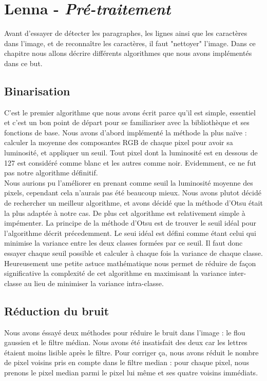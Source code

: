 \chapter{Lenna - \emph{Pré-traitement}}
Avant d'essayer de détecter les paragraphes, les lignes ainsi que les caractères dans l'image, et de reconnaître les caractères, il faut "nettoyer" l'image. Dans ce chapitre nous allons décrire différents algorithmes que nous avons implémentés dans ce but.\\

\section{Binarisation}
C'est le premier algorithme que nous avons écrit parce qu'il est simple, essentiel et c'est un bon point de départ pour se familiariser avec la bibliothèque et ses fonctions de base. Nous avons d'abord implémenté la méthode la plus naïve : calculer la moyenne des composantes RGB de chaque pixel pour avoir sa luminosité, et appliquer un seuil. Tout pixel dont la luminosité est en dessous de 127 est considéré comme blanc et les autres comme noir. Evidemment, ce ne fut pas notre algorithme définitif.\\

Nous aurions pu l'améliorer en prenant comme seuil la luminosité moyenne des pixels, cependant cela n'aurais pas été beaucoup mieux. Nous avons plutot décidé de rechercher un meilleur algorithme, et avons décidé que la méthode d'Otsu était la plus adaptée à notre cas. De plus cet algorithme est relativement simple à impémenter. La principe de la méthode d'Otsu est de trouver le seuil idéal pour l'algorithme décrit précedemment. Le seui idéal est défini comme étant celui qui minimise la variance entre les deux classes formées par ce seuil. Il faut donc essayer chaque seuil possible et calculer à chaque fois la variance de chaque classe. Heureusement une petite astuce mathématique nous permet de réduire de façon significative la complexité de cet algorithme en maximisant la variance inter-classe au lieu de minimiser la variance intra-classe.\\

\section{Réduction du bruit}

Nous avons éssayé deux méthodes pour réduire le bruit dans l'image : le flou gaussien et le filtre médian. Nous avons été insatisfait des deux car les lettres étaient moins lisible après le filtre. Pour corriger ça, nous avons réduit le nombre de pixel voisins pris en compte dans le filtre median : pour chaque pixel, nous prenons le pixel median parmi le pixel lui même et ses quatre voisins immédiats.\\

